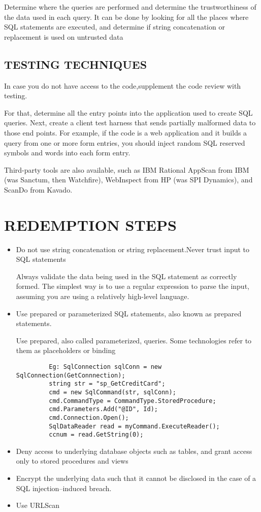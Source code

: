 \documentclass[a4paper, 11pt]{article} %
\begin{document}
	Determine where the queries are performed and determine the trustworthiness of the data
	used in each query. It can be done by looking for all the places where SQL
	statements are executed, and determine if string concatenation or replacement is used on
	untrusted data
	
	\subsection*{TESTING TECHNIQUES}
	In case you do not have access to the code,supplement the code review with testing.
	
	For that, determine all the entry points into the application used to create SQL queries.
	Next, create a client test harness that sends partially malformed data to those end points.
	For example, if the code is a web application and it builds a query from one or more form
	entries, you should inject random SQL reserved symbols and words into each form entry.
	
	Third-party tools are also available, such as IBM Rational AppScan from IBM (was
	Sanctum, then Watchfire), WebInspect from HP (was SPI Dynamics), and ScanDo from
	Kavado.
	
	\section*{REDEMPTION STEPS}
	\begin{itemize}
		\item Do not use string concatenation or string replacement.Never trust input to SQL statements
		
		Always validate the data being used in the SQL statement as correctly formed. The simplest way is to
		use a regular expression to parse the input, assuming you are using a relatively high-level
		language.
		\item Use prepared or parameterized SQL statements, also known as prepared statements.
		
		 Use prepared, also called parameterized, queries. Some
		 technologies refer to them as placeholders or binding
		 \begin{verbatim}
		 Eg: SqlConnection sqlConn = new SqlConnection(GetConnnection);
		 string str = "sp_GetCreditCard";
		 cmd = new SqlCommand(str, sqlConn);
		 cmd.CommandType = CommandType.StoredProcedure;
		 cmd.Parameters.Add("@ID", Id);
		 cmd.Connection.Open();
		 SqlDataReader read = myCommand.ExecuteReader();
		 ccnum = read.GetString(0);
		 \end{verbatim}
		\item  Deny access to underlying database objects such as tables, and grant access only to stored procedures and views
	 	\item 	Encrypt the underlying data such that it cannot be disclosed in the case of a SQL injection–induced breach.
	 	
	 	\item Use URLScan 
	 \end{itemize}


	
	
\end{document}
